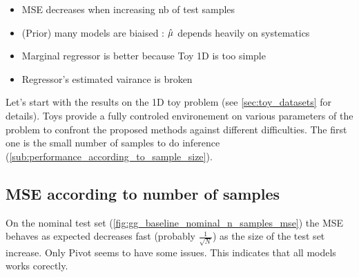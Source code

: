 \begin{itemize}
  \item MSE decreases when increasing nb of test samples
  \item (Prior) many models are biaised : $\hat\mu$ depends heavily on systematics
  \item Marginal regressor is better because Toy 1D is too simple
  \item Regressor's estimated vairance is broken
\end{itemize}

Let's start with the results on the 1D toy problem (see \autoref{sec:toy_datasets} for details).
Toys provide a fully controled environement on various parameters of the problem to confront the proposed methods against different difficulties.
The first one is the small number of samples to do inference (\autoref{sub:performance_according_to_sample_size}).



\subsection{MSE according to number of samples}


On the nominal test set (\autoref{fig:gg_baseline_nominal_n_samples_mse}) the MSE behaves as expected \ie decreases fast (probably $\frac{1}{\sqrt{N}}$) as the size of the test set increase.
Only Pivot seems to have some issues.
This indicates that all models works corectly.

